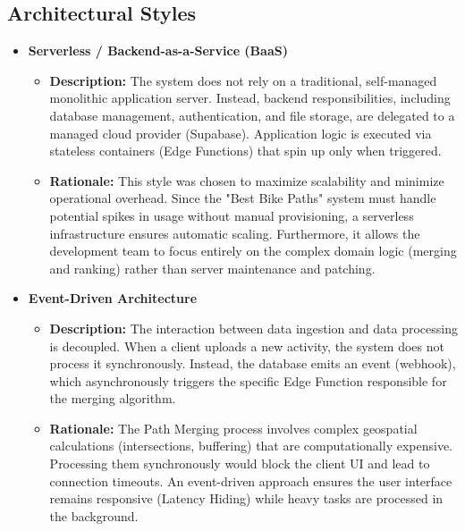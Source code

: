 \subsection{Architectural Styles}

\begin{itemize}
    \item \textbf{Serverless / Backend-as-a-Service (BaaS)}
    \begin{itemize}
        \item \textbf{Description:} The system does not rely on a traditional, self-managed monolithic application server. Instead, backend responsibilities, including database management, authentication, and file storage, are delegated to a managed cloud provider (Supabase). Application logic is executed via stateless containers (Edge Functions) that spin up only when triggered.
        \item \textbf{Rationale:} This style was chosen to maximize scalability and minimize operational overhead. Since the "Best Bike Paths" system must handle potential spikes in usage without manual provisioning, a serverless infrastructure ensures automatic scaling. Furthermore, it allows the development team to focus entirely on the complex domain logic (merging and ranking) rather than server maintenance and patching.
    \end{itemize}

    \item \textbf{Event-Driven Architecture}
    \begin{itemize}
        \item \textbf{Description:} The interaction between data ingestion and data processing is decoupled. When a client uploads a new activity, the system does not process it synchronously. Instead, the database emits an event (webhook), which asynchronously triggers the specific Edge Function responsible for the merging algorithm.
        \item \textbf{Rationale:} The Path Merging process involves complex geospatial calculations (intersections, buffering) that are computationally expensive. Processing them synchronously would block the client UI and lead to connection timeouts. An event-driven approach ensures the user interface remains responsive (Latency Hiding) while heavy tasks are processed in the background.
    \end{itemize}


\end{itemize}
